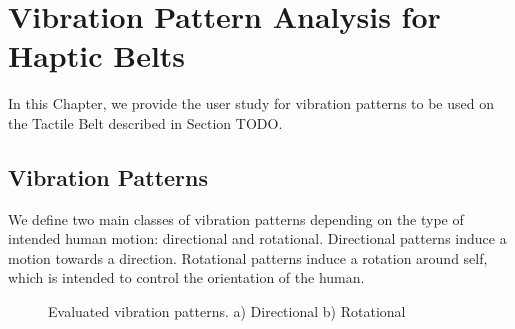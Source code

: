 \chapter{Vibration Pattern Analysis for Haptic Belts}
\label{chapter:vibration_pattern_analysis_for_haptic_belts}

In this Chapter, we provide the user study for vibration patterns to be used on the Tactile Belt described in Section TODO.

\section{Vibration Patterns}

We define two main classes of vibration patterns depending on the type of intended human motion: directional and rotational. Directional patterns induce a motion towards a direction. Rotational patterns induce a rotation around self, which is intended to control the orientation of the human. 




\begin{figure}[ht!]
\centering
%
    \caption{%
	Evaluated vibration patterns. a) Directional b) Rotational
     }%
   \label{fig:directional_rotational}
\end{figure}

